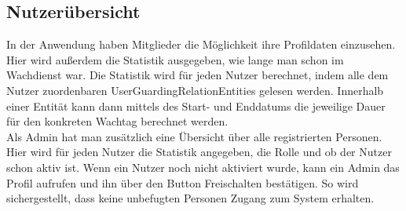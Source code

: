 \documentclass[fontsize=12pt,openright,oneside,paper=a4,BCOR=1cm]{scrbook}
\begin{document}
\subsection{Nutzerübersicht}

In der Anwendung haben Mitglieder die Möglichkeit ihre Profildaten einzusehen. Hier wird außerdem die Statistik ausgegeben, wie lange man schon im Wachdienst war. Die Statistik wird für jeden Nutzer berechnet, indem alle dem Nutzer zuordenbaren \glqq UserGuardingRelationEntities\grqq{} gelesen werden. Innerhalb einer Entit\"at kann dann mittels des Start- und Enddatums die jeweilige Dauer f\"ur den konkreten Wachtag berechnet werden.\\
Als Admin hat man zusätzlich eine Übersicht über alle registrierten Personen. Hier wird für jeden Nutzer die Statistik angegeben, die Rolle und ob der Nutzer schon aktiv ist. Wenn ein Nutzer noch nicht aktiviert wurde, kann ein Admin das Profil aufrufen und ihn über den Button \glqq Freischalten\grqq{} bestätigen. So wird sichergestellt, dass keine unbefugten Personen Zugang zum System erhalten.
\end{document}

